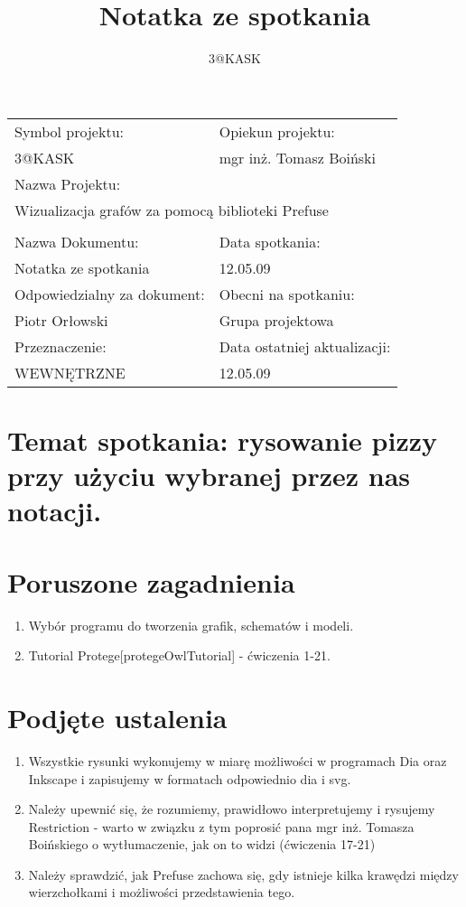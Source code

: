 \documentclass[a4paper,10pt]{article}
\title{Notatka ze spotkania}
\author{3@KASK}
\begin{document}



\maketitle


\begin{center}
\begin{tabular}{|p{7cm}|p{7cm}|}
\hline
Symbol projektu: & Opiekun projektu:   \tabularnewline 
3@KASK & mgr inż. Tomasz Boiński    \tabularnewline \hline
\multicolumn{2}{|l|}{Nazwa Projektu: } \tabularnewline
\multicolumn{2}{|l|}{Wizualizacja grafów za pomocą biblioteki Prefuse } \tabularnewline 
\hline
\multicolumn{2}{l}{ } \tabularnewline %
\hline 
Nazwa Dokumentu: & Data spotkania:   \tabularnewline 
Notatka ze spotkania & 12.05.09 \tabularnewline \hline
Odpowiedzialny za dokument: & Obecni na spotkaniu:   \tabularnewline 
Piotr Orłowski & Grupa projektowa \tabularnewline \hline
Przeznaczenie: & Data ostatniej aktualizacji:   \tabularnewline 
WEWNĘTRZNE & 12.05.09 \tabularnewline \hline
\end{tabular}
\end{center}



\section{Temat spotkania: rysowanie pizzy przy użyciu wybranej przez nas notacji.}


\section{Poruszone zagadnienia}
\begin{enumerate}
 \item Wybór programu do tworzenia grafik, schematów i modeli.
 \item Tutorial Protege[protegeOwlTutorial] - ćwiczenia 1-21.  
\end{enumerate}

\section{Podjęte ustalenia}
\begin{enumerate}
 \item Wszystkie rysunki wykonujemy w miarę możliwości w programach Dia oraz Inkscape i zapisujemy w formatach odpowiednio dia i svg.
\item Należy upewnić się, że rozumiemy, prawidłowo interpretujemy i rysujemy Restriction - warto w związku z tym poprosić pana mgr inż. Tomasza Boińskiego o wytłumaczenie, jak on to widzi (ćwiczenia 17-21)
\item Należy sprawdzić, jak Prefuse zachowa się, gdy istnieje kilka krawędzi między wierzchołkami i możliwości przedstawienia tego.  
\end{enumerate}



%
\end{document}
